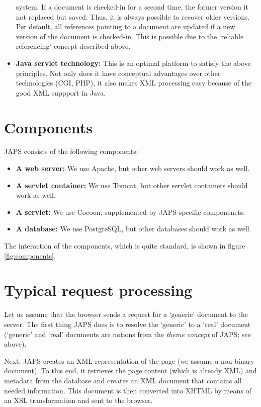 \documentclass[a4paper,11pt]{article}
\newcommand{\minorheadline}[1]{\textbf{#1:}}
\begin{document}
\begin{itemize}
  system. If a document is checked-in for a second time, the former version it
  not replaced but saved. Thus, it is always possible to recover older
  versions. Per default, all references pointing to a document are updated if a
  new version of the document is checked-in. This is possible due to the
  `reliable referencing' concept described above.
\item \minorheadline{Java servlet technology}
  This is an optimal platform to satisfy the above principles. Not only does it have
  conceptual advantages over other technologies (CGI, PHP), it also makes XML processing
  easy because of the good XML suppport in Java.
\end{itemize}

\section{Components}

JAPS consists of the following components:
\begin{itemize}
\item \minorheadline{A web server}
  We use Apache, but other web servers should work as well.
\item \minorheadline{A servlet container}
  We use Tomcat, but other servlet containers should work as well. 
\item \minorheadline{A servlet} We use Cocoon, supplemented by JAPS-specific
  componenets.
\item \minorheadline{A database}
  We use PostgreSQL, but other databases should work as well.
\end{itemize}

The interaction of the components, which is quite standard, is shown in figure
\ref{fig:components}.

\section{Typical request processing}

Let us assume that the browser sends a request for a `generic' document to the server.
The first thing JAPS does is to resolve the `generic' to a `real' document (`generic' and
`real' documents are notions from the \emph{theme concept} of JAPS; see above).

Next, JAPS creates an XML representation of the page (we assume a non-binary document). To
this end, it retrieves the page content (which is already XML) and metadata from the
database and creates an XML document that contains all needed information. This document is
then converted into XHTML by means of an XSL transformation and sent to the browser.
\end{document}
